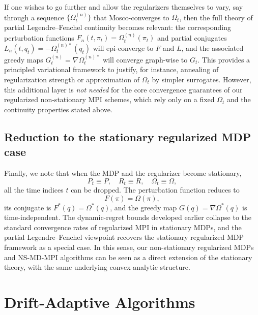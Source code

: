 \documentclass{article}
\theoremstyle{plain}
\theoremstyle{definition}
\theoremstyle{remark}
\newcommand{\1}{\mathbbm{1}}
\begin{document}
If one wishes to go further and allow the regularizers themselves to vary, say through a sequence $\{\Omega_t^{(n)}\}$ that Mosco-converges to $\Omega_t$, then the full theory of partial Legendre--Fenchel continuity becomes relevant: the corresponding perturbation functions $F_n(t,\pi_t)=\Omega_t^{(n)}(\pi_t)$ and partial conjugates $L_n(t,q_t)=-\Omega_t^{(n)*}(q_t)$ will epi-converge to $F$ and $L$, and the associated greedy maps $G_t^{(n)}=\nabla \Omega_t^{(n)*}$ will converge graph-wise to $G_t$. This provides a principled variational framework to justify, for instance, annealing of regularization strength or approximation of $\Omega_t$ by simpler surrogates. However, this additional layer is \emph{not needed} for the core convergence guarantees of our regularized non-stationary MPI schemes, which rely only on a fixed $\Omega_t$ and the continuity properties stated above.

\subsection{Reduction to the stationary regularized MDP case}

Finally, we note that when the MDP and the regularizer become stationary,
\[
P_t \equiv P,\quad R_t \equiv R,\quad \Omega_t \equiv \Omega,
\]
all the time indices $t$ can be dropped. The perturbation function reduces to
\[
F(\pi) = \Omega(\pi),
\]
its conjugate is $F^*(q)=\Omega^*(q)$, and the greedy map $G(q)=\nabla \Omega^*(q)$ is time-independent. The dynamic-regret bounds developed earlier collapse to the standard convergence rates of regularized MPI in stationary MDPs, and the partial Legendre--Fenchel viewpoint recovers the stationary regularized MDP framework as a special case. In this sense, our non-stationary regularized MDPs and NS-MD-MPI algorithms can be seen as a direct extension of the stationary theory, with the same underlying convex-analytic structure.


\section{Drift-Adaptive Algorithms}
\label{sec:alg}
\end{document}

